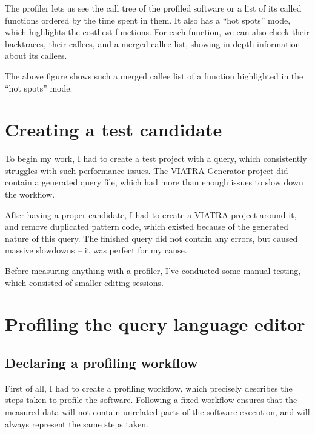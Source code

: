 \documentclass[11pt,a4paper,oneside]{report}
\begin{document}
The profiler lets us see the call tree of the profiled software or a list of its
called functions ordered by the time spent in them. It also has a ``hot spots''
mode, which highlights the costliest functions. For each function, we can also
check their backtraces, their callees, and a merged callee list, showing
in-depth information about its callees.

The above figure shows such a merged callee list of a function highlighted in
the ``hot spots'' mode.

\section{Creating a test candidate}
To begin my work, I had to create a test project with a query, which
consistently struggles with such performance issues. The VIATRA-Generator
project\cite{github-viatra-generator} did contain a generated query file, which
had more than enough issues to slow down the workflow.

After having a proper candidate, I had to create a VIATRA
project\cite{github-viatra-vql-slowdown-example} around it, and
remove duplicated pattern code, which existed because of the generated nature
of this query. The finished query did not contain any errors, but caused massive
slowdowns -- it was perfect for my cause.

Before measuring anything with a profiler, I've conducted some manual testing,
which consisted of smaller editing sessions.

\section{Profiling the query language editor}
\subsection{Declaring a profiling workflow}
First of all, I had to create a profiling workflow, which precisely describes
the steps taken to profile the software. Following a fixed workflow ensures that
the measured data will not contain unrelated parts of the software execution,
and will always represent the same steps taken.
\end{document}
